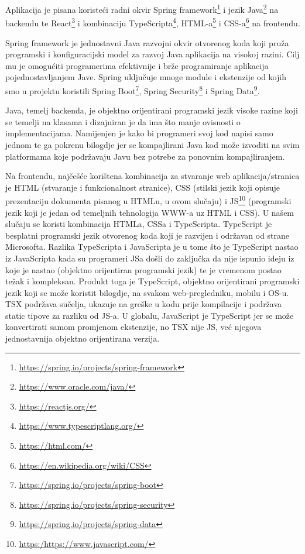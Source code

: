         Aplikacija je pisana koristeći radni okvir Spring framework\footnote{\url{https://spring.io/projects/spring-framework}} i jezik Java\footnote{\url{https://www.oracle.com/java/}} na backendu te React\footnote{\url{https://reactjs.org/}} i kombinaciju TypeScripta\footnote{\url{https://www.typescriptlang.org/}}, HTML-a\footnote{\url{https://html.com/}} i CSS-a\footnote{\url{https://en.wikipedia.org/wiki/CSS}} na frontendu.
        
        Spring framework je jednostavni Java razvojni okvir otvorenog koda koji pruža programski i konfiguracijski model za razvoj Java aplikacija na visokoj razini. Cilj mu je omogućiti programerima efektivnije i brže programiranje aplikacija pojednostavljanjem Jave. Spring uključuje mnoge module i ekstenzije od kojih smo u projektu koristili Spring Boot\footnote{\url{https://spring.io/projects/spring-boot}}, Spring Security\footnote{\url{https://spring.io/projects/spring-security}} i Spring Data\footnote{\url{https://spring.io/projects/spring-data}}.
        
        Java, temelj backenda, je objektno orijentirani programski jezik visoke razine koji se temelji na klasama i dizajniran je da ima što manje ovisnosti o implementacijama. Namijenjen je kako bi programeri svoj kod napisi samo jednom te ga pokrenu bilogdje jer se kompajlirani Java kod može izvoditi na svim platformama koje podržavaju Javu bez potrebe za ponovnim kompajliranjem.
        
        Na frontendu, najčešće korištena kombinacija za stvaranje web aplikacija/stranica je HTML (stvaranje i funkcionalnost stranice), CSS (stilski jezik koji opisuje prezentaciju dokumenta pisanog u HTMLu, u ovom slučaju) i JS\footnote{\url{https:/https://www.javascript.com/}} (programski jezik koji je jedan od temeljnih tehnologija WWW-a uz HTML i CSS). U našem slučaju se koristi kombinacija HTMLa, CSSa i TypeScripta. TypeScript je besplatni programski jezik otvorenog koda koji je razvijen i održavan od strane Microsofta. Razlika TypeScripta i JavaScripta je u tome što je TypeScript nastao iz JavaScripta kada su programeri JSa došli do zaključka da nije ispunio ideju iz koje je nastao (objektno orijentiran programski jezik) te je vremenom postao težak i kompleksan. Produkt toga je TypeScript, objektno orijentirani programski jezik koji se može koristit bilogdje, na svakom web-pregledniku, mobilu i OS-u. TSX podržava sučelja, ukazuje na greške u kodu prije kompilacije i podržava static tipove za razliku od JS-a. U globalu, JavaScript je TypeScript jer se može konvertirati samom promjenom ekstenzije, no TSX nije JS, već njegova jednostavnija objektno orijentirana verzija.
        
